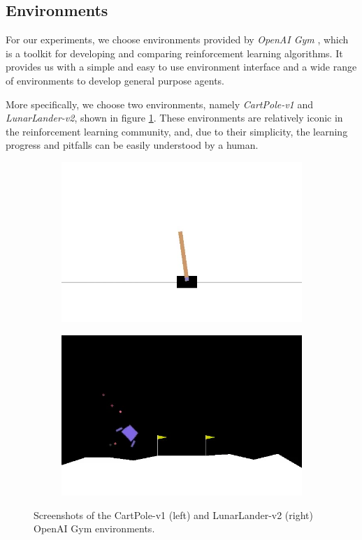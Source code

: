 \subsection{Environments}
For our experiments, we choose environments provided by \textit{OpenAI Gym} \cite{gym}, which is a toolkit for developing and comparing reinforcement learning algorithms. It provides us with a simple and easy to use environment interface and a wide range of environments to develop general purpose agents.

More specifically, we choose two environments, namely \textit{CartPole-v1} and \textit{LunarLander-v2}, shown in figure \ref{fig:environments}. These environments are relatively iconic in the reinforcement learning community, and, due to their simplicity, the learning progress and pitfalls can be easily understood by a human.
\begin{figure}[ht]
    \centering
    \begin{subfigure}{0.49\textwidth}
        \raggedleft
        \includegraphics[width=\textwidth]{assets/cartpole.jpg}
    \end{subfigure}
    \begin{subfigure}{0.5\textwidth}
        \raggedright
        \includegraphics[width=\textwidth]{assets/lunarlander.jpg}
    \end{subfigure}
    \caption{Screenshots of the CartPole-v1 (left) and LunarLander-v2 (right) OpenAI Gym environments.}
    \label{fig:environments}
\end{figure}

